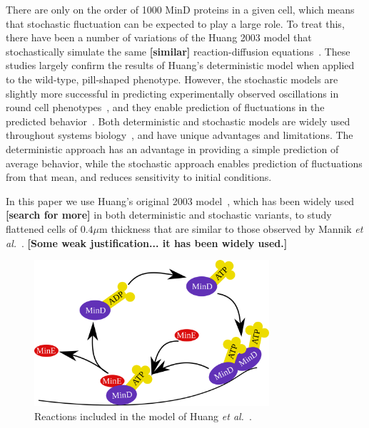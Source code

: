 \documentclass[letterpaper,twocolumn,amsmath,amssymb,pre]{revtex4-1}
\newcommand{\red}[1]{{\bf \color{red} #1}}
\newcommand{\fixme}[1]{\red{[#1]}}
\newcommand\micron{\ensuremath{\mu\text{m}}}
\begin{document}
There are only on the order of 1000 MinD proteins in a given cell,
which means that stochastic fluctuation can be expected to play a
large role.  To treat this, there have been a number of variations of
the Huang 2003 model that stochastically simulate the same \fixme{similar}
reaction-diffusion equations~\cite{fange2006noise, kerr2006division}.
These studies largely confirm the results of Huang's deterministic
model when applied to the wild-type, pill-shaped phenotype.  However,
the stochastic models are slightly more successful in predicting
experimentally observed oscillations in round cell
phenotypes~\cite{fange2006noise, huang2004min}, and they enable
prediction of fluctuations in the predicted
behavior~\cite{kruse2007experimentalist}.  Both deterministic and
stochastic models are widely used throughout systems
biology~\cite{lawson2013spatial, robb2014stochastic,
  oguz2014stochastic, fu2013deterministic, rudiger2014stochastic}, and
have unique advantages and limitations.  The deterministic approach
has an advantage in providing a simple prediction of average behavior,
while the stochastic approach enables prediction of fluctuations from
that mean, and reduces sensitivity to initial conditions.

In this paper we use Huang's original 2003
model~\cite{huang2003dynamic}, which has been widely
used~\cite{hattne2005stochastic} \fixme{search for more} in both
deterministic and stochastic variants, to study flattened cells of
$0.4\micron$ thickness that are similar to those observed by Mannik
\emph{et al.}~\cite{mannik2009bacterial}.  \fixme{Some weak
  justification... it has been widely used.}

\begin{figure}
  \includegraphics[width=8.7cm]{reactions}
  \caption{Reactions included in the model of Huang \emph{et
      al.}~\cite{huang2003dynamic}.}\label{fig:reactions}
\end{figure}
\end{document}
